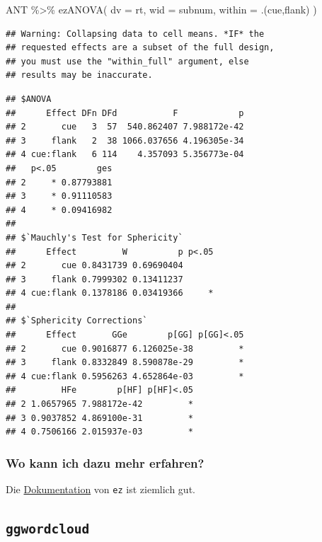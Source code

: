 \documentclass[
]{book}
\newenvironment{Shaded}{\begin{snugshade}}{\end{snugshade}}
\newcommand{\AttributeTok}[1]{\textcolor[rgb]{0.77,0.63,0.00}{#1}}
\newcommand{\FunctionTok}[1]{\textcolor[rgb]{0.00,0.00,0.00}{#1}}
\newcommand{\NormalTok}[1]{#1}
\newcommand{\SpecialCharTok}[1]{\textcolor[rgb]{0.00,0.00,0.00}{#1}}
\begin{document}
\begin{Shaded}
\begin{Highlighting}[]
\NormalTok{ANT }\SpecialCharTok{\%\textgreater{}\%} 
  \FunctionTok{ezANOVA}\NormalTok{(}
    \AttributeTok{dv =}\NormalTok{ rt,}
    \AttributeTok{wid =}\NormalTok{ subnum,}
    \AttributeTok{within =}\NormalTok{ .(cue,flank)}
\NormalTok{  )}
\end{Highlighting}
\end{Shaded}

\begin{verbatim}
## Warning: Collapsing data to cell means. *IF* the
## requested effects are a subset of the full design,
## you must use the "within_full" argument, else
## results may be inaccurate.
\end{verbatim}

\begin{verbatim}
## $ANOVA
##      Effect DFn DFd           F            p
## 2       cue   3  57  540.862407 7.988172e-42
## 3     flank   2  38 1066.037656 4.196305e-34
## 4 cue:flank   6 114    4.357093 5.356773e-04
##   p<.05        ges
## 2     * 0.87793881
## 3     * 0.91110583
## 4     * 0.09416982
## 
## $`Mauchly's Test for Sphericity`
##      Effect         W          p p<.05
## 2       cue 0.8431739 0.69690404      
## 3     flank 0.7999302 0.13411237      
## 4 cue:flank 0.1378186 0.03419366     *
## 
## $`Sphericity Corrections`
##      Effect       GGe        p[GG] p[GG]<.05
## 2       cue 0.9016877 6.126025e-38         *
## 3     flank 0.8332849 8.590878e-29         *
## 4 cue:flank 0.5956263 4.652864e-03         *
##         HFe        p[HF] p[HF]<.05
## 2 1.0657965 7.988172e-42         *
## 3 0.9037852 4.869100e-31         *
## 4 0.7506166 2.015937e-03         *
\end{verbatim}

\hypertarget{wo-kann-ich-dazu-mehr-erfahren-1}{%
\subsubsection{Wo kann ich dazu mehr erfahren?}\label{wo-kann-ich-dazu-mehr-erfahren-1}}

Die \href{https://www.rdocumentation.org/packages/ez/versions/4.4-0}{Dokumentation} von \texttt{ez} ist ziemlich gut.

\hypertarget{ggwordcloud}{%
\subsection{\texorpdfstring{\texttt{ggwordcloud}}{ggwordcloud}}\label{ggwordcloud}}
\end{document}
